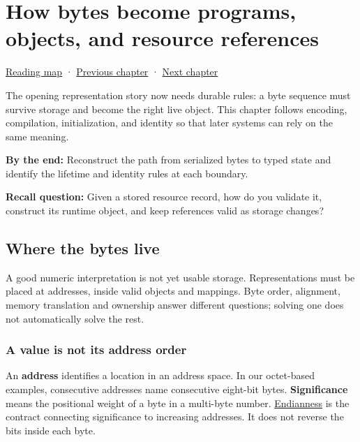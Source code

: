 \hypertarget{05-engine-i-ch002}{}
\chapter{How bytes become programs, objects, and resource references}\label{stagechapter:05-engine-i-ch002}\label{05-engine-i-ch002-how-bytes-become-programs-objects-and-resource-references}

\hyperref[volume-reading-map]{Reading map} · \hyperref[05-engine-i-ch001-a-game-promise-becomes-bytes-and-running-state]{Previous chapter} · \hyperref[05-engine-i-ch003-object-representation-lifetime-and-enforceable-promises]{Next chapter}

The opening representation story now needs durable rules: a byte sequence must survive storage and become the right live object. This chapter follows encoding, compilation, initialization, and identity so that later systems can rely on the same meaning.

\textbf{By the end:} Reconstruct the path from serialized bytes to typed state and identify the lifetime and identity rules at each boundary.

\textbf{Recall question:} Given a stored resource record, how do you validate it, construct its runtime object, and keep references valid as storage changes?

\section{Where the bytes live}\label{05-engine-i-ch002-where-the-bytes-live}

A good numeric interpretation is not yet usable storage. Representations must be placed at addresses, inside valid objects and mappings. Byte order, alignment, memory translation and ownership answer different questions; solving one does not automatically solve the rest.

\subsection{A value is not its address order}\label{05-engine-i-ch002-a-value-is-not-its-address-order}

An \textbf{address} identifies a location in an address space. In our octet-based examples, consecutive addresses name consecutive eight-bit bytes. \textbf{Significance} means the positional weight of a byte in a multi-byte number. \hyperref[appendix-bc07c3d25b18]{Endianness} is the contract connecting significance to increasing addresses. It does not reverse the bits inside each byte.

